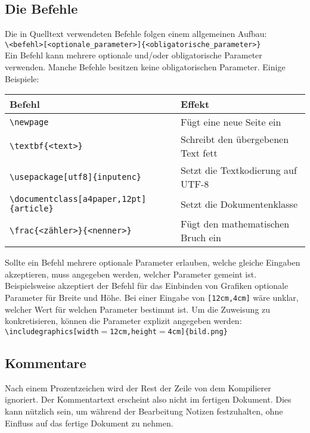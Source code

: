 \subsection{Die Befehle} %
\label{sub:die_befehle}
Die in Quelltext verwendeten Befehle folgen einem allgemeinen Aufbau:\\
\texttt{\textbackslash <befehl>[<optionale\_parameter>]\{<obligatorische\_parameter>\}}\\
Ein Befehl kann mehrere optionale und/oder obligatorische Parameter verwenden. Manche Befehle besitzen keine obligatorischen Parameter. Einige Beispiele:\\
\begin{table}[h!]
	\begin{tabular}{ll}
		\toprule
		Befehl                                                                                     & Effekt                             \\
		\midrule
		\texttt{\textbackslash{}newpage}                                                                    & Fügt eine neue Seite ein           \\
		\texttt{\textbackslash{}textbf\{\textless{}text\textgreater{}\}}                                    & Schreibt den übergebenen Text fett \\
		\texttt{\textbackslash{}usepackage{[}utf8{]}\{inputenc\}}                                           & Setzt die Textkodierung auf UTF-8  \\
		\texttt{\textbackslash{}documentclass{[}a4paper,12pt{]}\{article\}}		                            & Setzt die Dokumentenklasse  \\
		\texttt{\textbackslash{}frac\{\textless{}zähler\textgreater{}\}\{\textless{}nenner\textgreater{}\}} & Fügt den mathematischen Bruch ein \\
		\bottomrule
	\end{tabular}
\end{table}
Sollte ein Befehl mehrere optionale Parameter erlauben, welche gleiche Eingaben akzeptieren, muss angegeben werden, welcher Parameter gemeint ist. Beispielsweise akzeptiert der Befehl für das Einbinden von Grafiken optionale Parameter für Breite und Höhe. Bei einer Eingabe von \texttt{\textellipsis{}[12cm,4cm]\textellipsis{}} wäre unklar, welcher Wert für welchen Parameter bestimmt ist. Um die Zuweisung zu konkretisieren, können die Parameter explizit angegeben werden:\\
\texttt{\textbackslash{}includegraphics{[}width$=$12cm,height$=$4cm{]}\{bild.png\}}
\subsection{Kommentare} %
\label{sub:kommentare}
Nach einem Prozentzeichen wird der Rest der Zeile von dem Kompilierer ignoriert. Der Kommentartext erscheint also nicht im fertigen Dokument. Dies kann nützlich sein, um während der Bearbeitung Notizen festzuhalten, ohne Einfluss auf das fertige Dokument zu nehmen. 

